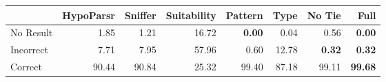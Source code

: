 \begin{tabular}{lrrr|rrrr}
 & HypoParsr & Sniffer & Suitability & Pattern & Type & No Tie & Full\\
\hline
No Result & 1.85 & 1.21 & 16.72 & \textbf{0.00} & 0.04 & 0.56 & \textbf{0.00}\\
Incorrect & 7.71 & 7.95 & 57.96 & 0.60 & 12.78 & \textbf{0.32} & \textbf{0.32}\\
Correct & 90.44 & 90.84 & 25.32 & 99.40 & 87.18 & 99.11 & \textbf{99.68}\\
\hline
\end{tabular}